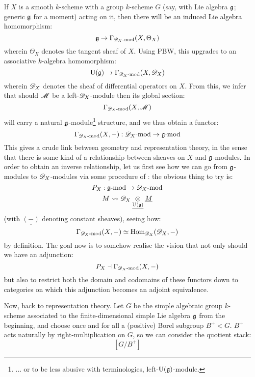        If $X$ is a smooth $k$-scheme with a group $k$-scheme $G$ (say, with Lie algebra $\mathfrak{g}$; generic $\mathfrak{g}$ for a moment) acting on it, then there will be an induced Lie algebra homomorphism:
            $$\mathfrak{g} \to \Gamma_{\mathscr{D}_X\text{-}\mathrm{mod}}(X, \Theta_X)$$
        wherein $\Theta_X$ denotes the tangent sheaf of $X$. Using PBW, this upgrades to an associative $k$-algebra homomorphism:
            $$\mathrm{U}(\mathfrak{g}) \to \Gamma_{\mathscr{D}_X\text{-}\mathrm{mod}}(X, \mathscr{D}_X)$$
        wherein $\mathscr{D}_X$ denotes the sheaf of differential operators on $X$. From this, we infer that should $\mathscr{M}$ be a left-$\mathscr{D}_X$-module then its global section:
            $$\Gamma_{\mathscr{D}_X\text{-}\mathrm{mod}}(X, \mathscr{M})$$
        will carry a natural $\mathfrak{g}$-module\footnote{... or to be less abusive with terminologies, left-$\mathrm{U}(\mathfrak{g})$-module.} structure, and we thus obtain a functor:
            $$\Gamma_{\mathscr{D}_X\text{-}\mathrm{mod}}(X, -): \mathscr{D}_X\text{-}\mathrm{mod} \to \mathfrak{g}\text{-}\mathrm{mod}$$
        This gives a crude link between geometry and representation theory, in the sense that there is some kind of a relationship between sheaves on $X$ and $\mathfrak{g}$-modules. In order to obtain an inverse relationship, let us first see how we can go from $\mathfrak{g}$-modules to $\mathscr{D}_X$-modules via some procedure of : the obvious thing to try is:
            $$P_X: \mathfrak{g}\text{-}\mathrm{mod} \to \mathscr{D}_X\text{-}\mathrm{mod}$$
            $$M \mapsto \scrD_X \tensor_{\underline{\rmU(\g)}} \underline{M}$$
        (with $\underline{(-)}$ denoting constant sheaves), seeing how:
            $$\Gamma_{\mathscr{D}_X\text{-}\mathrm{mod}}(X, -) \simeq \mathrm{Hom}_{\mathscr{D}_X}(\mathscr{D}_X, -)$$
        by definition. The goal now is to somehow realise the vision that not only should we have an adjunction:
            $$P_X \dashv \Gamma_{\mathscr{D}_X\text{-}\mathrm{mod}}(X, -)$$
        but also to restrict both the domain and codomains of these functors down to categories on which this adjunction becomes an adjoint equivalence.

        Now, back to representation theory. Let $G$ be the simple algebraic group $k$-scheme associated to the finite-dimensional simple Lie algebra $\mathfrak{g}$ from the beginning, and choose once and for all a (positive) Borel subgroup $B^+ < G$. $B^+$ acts naturally by right-multiplication on $G$, so we can consider the quotient stack:
            $$[G/B^+]$$
        
    
    \printbibliography

